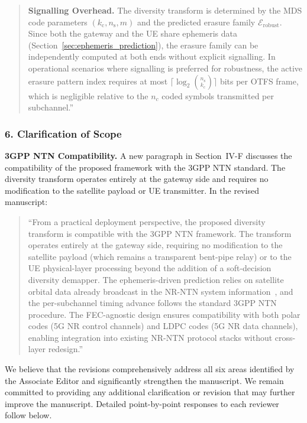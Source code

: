 \begin{quote}
{\color{blue}\textbf{Signalling Overhead.}
The diversity transform is determined by the MDS code parameters
$(k_{\mathrm{c}}, n_{\mathrm{s}}, m)$ and the predicted erasure
family $\mathcal{E}_{\mathrm{robust}}$. Since both the gateway
and the UE share ephemeris data
(Section~\ref{sec:ephemeris_prediction}), the erasure family can
be independently computed at both ends without explicit signalling.
In operational scenarios where signalling is preferred for
robustness, the active erasure pattern index requires at most
$\lceil\log_2\binom{n_{\mathrm{s}}}{k_{\mathrm{c}}}\rceil$ bits
per OTFS frame, which is negligible relative to the $n_c$ coded
symbols transmitted per subchannel.}''
\end{quote}

\subsubsection*{6. Clarification of Scope}

\noindent\textbf{3GPP NTN Compatibility.}
A new paragraph in Section~IV-F discusses the compatibility of the proposed framework with the 3GPP NTN standard. The diversity transform operates entirely at the gateway side and requires no modification to the satellite payload or UE transmitter. In the revised manuscript:

\begin{quote}
``{\color{blue}From a practical deployment perspective, the proposed diversity transform is compatible with the 3GPP NTN framework. The transform operates entirely at the gateway side, requiring no modification to the satellite payload (which remains a transparent bent-pipe relay) or to the UE physical-layer processing beyond the addition of a soft-decision diversity demapper. The ephemeris-driven prediction relies on satellite orbital data already broadcast in the NR-NTN system information~\cite{3GPP38821}, and the per-subchannel timing advance follows the standard 3GPP NTN procedure. The FEC-agnostic design ensures compatibility with both polar codes (5G NR control channels) and LDPC codes (5G NR data channels), enabling integration into existing NR-NTN protocol stacks without cross-layer redesign.}''
\end{quote}


\vskip 0.2in
We believe that the revisions comprehensively address all six areas identified by the Associate Editor and significantly strengthen the manuscript. We remain committed to providing any additional clarification or revision that may further improve the manuscript. Detailed point-by-point responses to each reviewer follow below.

\newpage